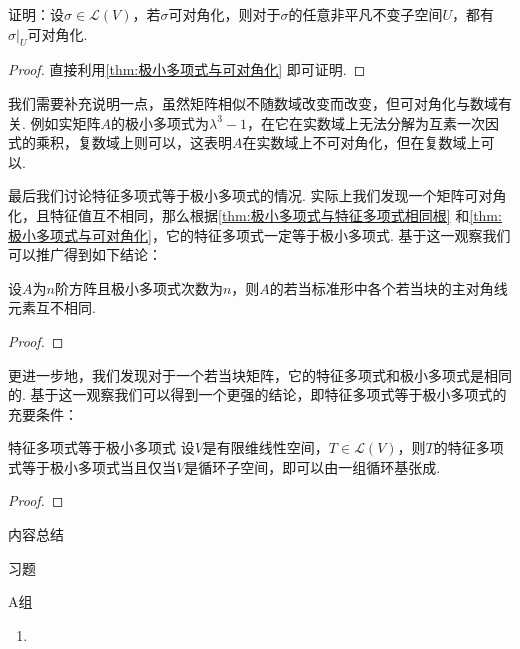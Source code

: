 \begin{example}{}{}
    证明：设$\sigma\in \mathcal{L}(V)$，若$\sigma$可对角化，则对于$\sigma$的任意非平凡不变子空间$U$，都有$\sigma\vert_U$可对角化.
\end{example}

\begin{proof}
    直接利用\autoref{thm:极小多项式与可对角化} 即可证明.
\end{proof}

我们需要补充说明一点，虽然矩阵相似不随数域改变而改变，但可对角化与数域有关. 例如实矩阵$A$的极小多项式为$\lambda^3-1$，在它在实数域上无法分解为互素一次因式的乘积，复数域上则可以，这表明$A$在实数域上不可对角化，但在复数域上可以.

最后我们讨论特征多项式等于极小多项式的情况. 实际上我们发现一个矩阵可对角化，且特征值互不相同，那么根据\autoref{thm:极小多项式与特征多项式相同根} 和\autoref{thm:极小多项式与可对角化}，它的特征多项式一定等于极小多项式. 基于这一观察我们可以推广得到如下结论：
\begin{example}{}{}
    设$A$为$n$阶方阵且极小多项式次数为$n$，则$A$的若当标准形中各个若当块的主对角线元素互不相同.
\end{example}

\begin{proof}

\end{proof}

更进一步地，我们发现对于一个若当块矩阵，它的特征多项式和极小多项式是相同的. 基于这一观察我们可以得到一个更强的结论，即特征多项式等于极小多项式的充要条件：
\begin{theorem}{}{特征多项式等于极小多项式}
    设$V$是有限维线性空间，$T\in \mathcal{L}(V)$，则$T$的特征多项式等于极小多项式当且仅当$V$是循环子空间，即可以由一组循环基张成.
\end{theorem}
\begin{proof}

\end{proof}

\vspace{2ex}
\centerline{\heiti \Large 内容总结}

\vspace{2ex}
\centerline{\heiti \Large 习题}

\vspace{2ex}
{\kaishu }
\begin{flushright}
    \kaishu

\end{flushright}

\centerline{\heiti A组}
\begin{enumerate}
    \item
\end{enumerate}

